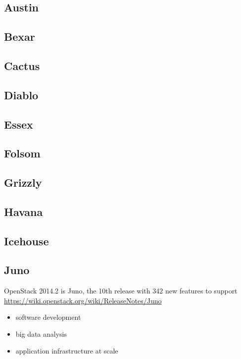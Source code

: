 \subsection{Austin}

\subsection{Bexar}

\subsection{Cactus}

\subsection{Diablo}

\subsection{Essex}

\subsection{Folsom}

\subsection{Grizzly}

\subsection{Havana}

\subsection{Icehouse}

\subsection{Juno}

OpenStack 2014.2 is Juno, the 10th release with 342 new features to support
\url{https://wiki.openstack.org/wiki/ReleaseNotes/Juno}
\begin{itemize}
  \item software development
  \item big data analysis
  \item application infrastructure at scale
\end{itemize}

